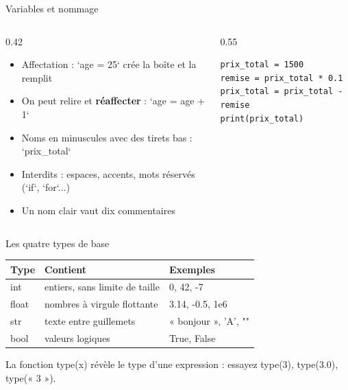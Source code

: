 \documentclass[aspectratio=169,11pt]{beamer}
\begin{document}
\begin{frame}[fragile]{Variables et nommage}
\begin{columns}[t]
\begin{column}{0.42\textwidth}
\begin{itemize}
  \setlength{\itemsep}{1.5pt}\setlength{\parskip}{0pt}
  \item Affectation : `age = 25` crée la boîte et la remplit
  \item On peut relire et \textbf{réaffecter} : `age = age + 1`
  \item Noms en minuscules avec des tirets bas : `prix\_total`
  \item Interdits : espaces, accents, mots réservés (`if`, `for`...)
  \item Un nom clair vaut dix commentaires
\end{itemize}
\end{column}
\hspace{0.02\textwidth}
\begin{column}{0.55\textwidth}
\begin{lstlisting}[style=pysmall]
prix_total = 1500
remise = prix_total * 0.1
prix_total = prix_total - remise
print(prix_total)
\end{lstlisting}
\end{column}
\end{columns}
\end{frame}

\begin{frame}{Les quatre types de base}
\renewcommand{\arraystretch}{1.3}\small
\begin{center}
\begin{tabular}{lll}
\toprule
\textbf{\color{PyBleu}Type} & \textbf{\color{PyBleu}Contient} & \textbf{\color{PyBleu}Exemples} \\
\midrule
int & entiers, sans limite de taille & 0, 42, -7 \\
float & nombres à virgule flottante & 3.14, -0.5, 1e6 \\
str & texte entre guillemets & « bonjour », 'A', "" \\
bool & valeurs logiques & True, False \\
\bottomrule
\end{tabular}
\end{center}

\vspace{4pt}

{\small\color{PyGris}La fonction type(x) révèle le type d'une expression : essayez type(3), type(3.0), type(« 3 »).}
\end{frame}
\end{document}
